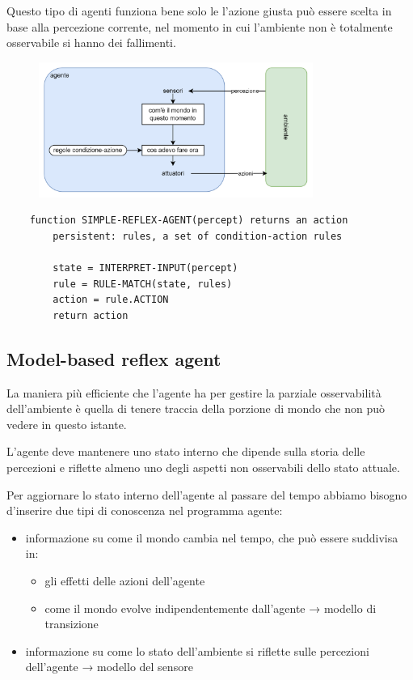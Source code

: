 Questo tipo di agenti funziona bene solo le l'azione giusta può essere scelta
in base alla percezione corrente, nel momento in cui l'ambiente non è
totalmente osservabile si hanno dei fallimenti.

\begin{figure}[H]
	\centering
	\includegraphics[width=0.8\textwidth]{capitoli/agenti-intelligenti/imgs/simple-reflex.png}
\end{figure}

\begin{lstlisting}
	function SIMPLE-REFLEX-AGENT(percept) returns an action
		persistent: rules, a set of condition-action rules
		
		state = INTERPRET-INPUT(percept)
		rule = RULE-MATCH(state, rules)
		action = rule.ACTION
		return action
\end{lstlisting}

\subsection{Model-based reflex agent}

La maniera più efficiente che l'agente ha per gestire la parziale osservabilità dell'ambiente è quella di tenere traccia della porzione di mondo che non può vedere in questo istante.

L'agente deve mantenere uno stato interno che dipende sulla storia delle percezioni e riflette almeno uno degli aspetti non osservabili dello stato attuale.

Per aggiornare lo stato interno dell'agente al passare del tempo abbiamo bisogno d'inserire due tipi di conoscenza nel programma agente:

\begin{itemize}
	\item informazione su come il mondo cambia nel tempo, che può essere suddivisa in:
	\begin{itemize}
		\item gli effetti delle azioni dell'agente 
		\item come il mondo evolve indipendentemente dall'agente → modello di transizione
	\end{itemize}
	\item informazione su come lo stato dell'ambiente si riflette sulle percezioni dell'agente → modello del sensore
\end{itemize}

